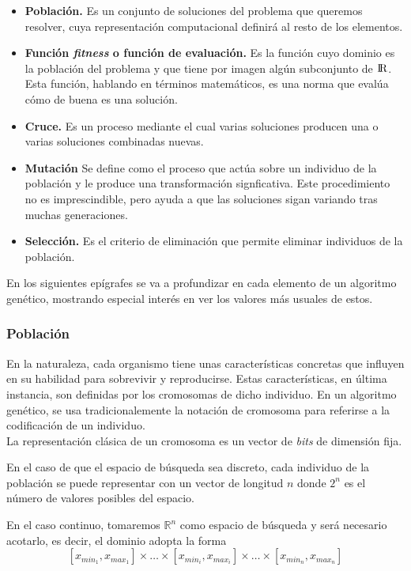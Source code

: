 		\begin{itemize}
			\item \textbf{Poblaci\'on.} Es un conjunto de soluciones del problema que queremos resolver, cuya representaci\'on computacional definir\'a al resto de los elementos.
			\item \textbf{Funci\'on \textit{fitness} o funci\'on de evaluaci\'on.} Es la funci\'on cuyo dominio es la poblaci\'on del problema y que tiene por imagen alg\'un subconjunto de ${\rm I\!R}$. Esta funci\'on, hablando en t\'erminos matem\'aticos, es una norma que eval\'ua c\'omo de buena es una soluci\'on.
			\item \textbf{Cruce.} Es un proceso mediante el cual varias soluciones producen una o varias soluciones combinadas nuevas. 
			\item \textbf{Mutaci\'on} Se define como el proceso que act\'ua sobre un individuo de la poblaci\'on y le produce una transformaci\'on signficativa. Este procedimiento no es imprescindible, pero ayuda a que las soluciones sigan variando tras muchas generaciones.
			\item \textbf{Selecci\'on.} Es el criterio de eliminaci\'on que permite eliminar individuos de la poblaci\'on.
		\end{itemize}
		
		En los siguientes ep\'igrafes se va a profundizar en cada elemento de un algoritmo gen\'etico, mostrando especial inter\'es en ver los valores m\'as usuales de estos.
		
			\subsubsection{Poblaci\'on}
			En la naturaleza, cada organismo tiene unas caracter\'isticas concretas que influyen en su habilidad para sobrevivir y reproducirse. Estas caracter\'isticas, en  \'ultima instancia, son definidas por los cromosomas de dicho individuo. En un algoritmo gen\'etico, se usa tradicionalemente la notaci\'on de cromosoma para referirse a la codificaci\'on de un individuo.\\
			
			La representaci\'on cl\'asica de un cromosoma es un vector de \textit{bits} de dimensi\'on fija. 
			
			En el caso de que el espacio de b\'usqueda sea discreto, cada individuo de la poblaci\'on se puede representar con un vector de longitud $n$ donde $2^n$ es el n\'umero de valores posibles del espacio.
			
			En el caso continuo, tomaremos ${\mathbb{R}^n}$ como espacio de b\'usqueda y ser\'a necesario acotarlo, es decir, el dominio adopta la forma \\
			\[[x_{min_1}, x_{max_1}]\times\dots\times[x_{min_i},x_{max_i}]\times\dots\times[x_{min_n},x_{max_n}]\]
			
